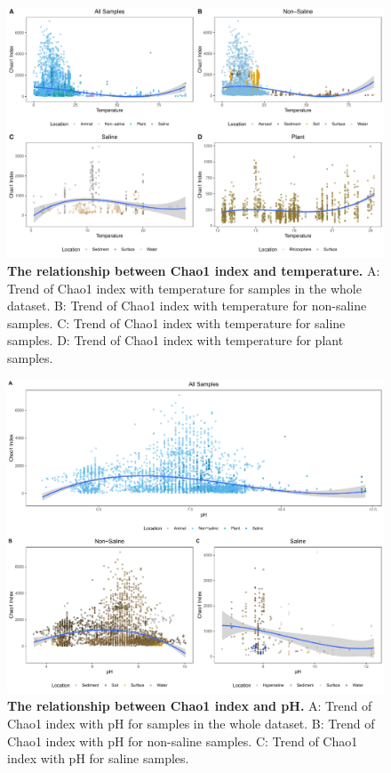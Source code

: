 \documentclass[11pt, a4paper]{article}
\begin{document}
\begin{spacing}{1.5}
\begin{figure}
    \centering
    \includegraphics[scale=0.33]{./Figures/Chao_T_empo2}
    \caption{\textbf{The relationship between Chao1 index and temperature.} A: Trend of Chao1 index with temperature for samples in the whole dataset. B: Trend of Chao1 index with temperature for non-saline samples. C: Trend of Chao1 index with temperature for saline samples. D: Trend of Chao1 index with temperature for plant samples.}
    \label{fig:Chao_T}
\end{figure}

\begin{figure}
    \centering
    \includegraphics[scale=0.33]{./Figures/Chao_pH_empo2}
    \caption{\textbf{The relationship between Chao1 index and pH.} A: Trend of Chao1 index with pH for samples in the whole dataset. B: Trend of Chao1 index with pH for non-saline samples. C: Trend of Chao1 index with pH for saline samples.}
    \label{fig:Chao_pH}
\end{figure}


\end{spacing}
\end{document}
